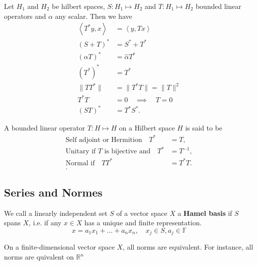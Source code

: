 \documentclass{article}
\theoremstyle{remark}
\begin{document}
\begin{theorem}
  Let $H_1$ and $H_2$ be hilbert spaces, $S: H_1 \mapsto H_2$ and $T: H_1 \mapsto H_2$ bounded linear operators and $\alpha$ any scalar. Then we have
  \begin{align}
    \left<T^{*}y,x \right> &= \left<y,Tx \right> \\
    \left( S +T \right)^{*} &= S^{*} + T^{*} \\
    \left( \alpha T \right)^{*} &= \hat{\alpha} T^{*} \\
    \left( T^{*} \right)^{*} &=   T^{*}\\  
    \|T T^{*}\| &=  \|T^{*} T\| =  \|T\|^{2} \\
    T^{*}T &= 0 \quad \implies \quad T=0   \\
    \left( ST \right)^{*} &= T^{*}S^{*} 
  .\end{align}
  
\end{theorem}

\begin{definition}
  A bounded linear operator $T: H \mapsto H$ on a Hilbert space $H$ is said to be 
  \begin{align*}
    \text{Self adjoint or Hermition} \quad T^{*} &= T ,\\
    \text{Unitary if $T$ is bijective and} \quad T^{*} &= T^{-1} ,\\
    \text{Normal if} \quad TT^{*} &= T^{*}T. \\ 
  .\end{align*}
  
\end{definition}


\subsection{Series and Normes}%
\label{sub:series_and_normes}

\begin{definition}
  We call a linearly independent set $S$ of a vector space $X$ a \textbf{Hamel basis} if $S$ spans $X$, i.e. if any $x \in X$ has a unique and finite representation. \[
  x  = a_1 x_1 + \ldots + a_{n} x_{n}, \quad x_{j} \in S, a_{j} \in \mathbb{F} 
  \] 
  
\end{definition}

\begin{theorem}
  On a finite-dimensional vector space $X$, all norms are equivalent. For instance, all norms are quivalent on $\mathbb{R}^{n}$
\end{theorem}
\end{document}
